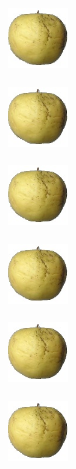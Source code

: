 \documentclass[10pt,a4paper]{article}
\begin{document}
\begin{figure}[h]
	\begin{subfigure}{0.24\textwidth}
		\centering
		\includegraphics[height=60px,width=60px]{apple_golden_train0}
	\end{subfigure}
	\begin{subfigure}{0.24\textwidth}
		\centering
		\includegraphics[height=60px,width=60px]{apple_golden_train1}
	\end{subfigure}
	\begin{subfigure}{0.24\textwidth}
		\centering
		\includegraphics[height=60px,width=60px]{apple_golden_train2}
	\end{subfigure}
	\begin{subfigure}{0.24\textwidth}
		\centering
		\includegraphics[height=60px,width=60px]{apple_golden_train3}
	\end{subfigure}
	\begin{subfigure}{0.24\textwidth}
		\centering
		\includegraphics[height=60px,width=60px]{apple_golden_train4}
	\end{subfigure}
	\begin{subfigure}{0.24\textwidth}
		\centering
		\includegraphics[height=60px,width=60px]{apple_golden_train5}
	\end{subfigure}

\end{figure}
\end{document}
